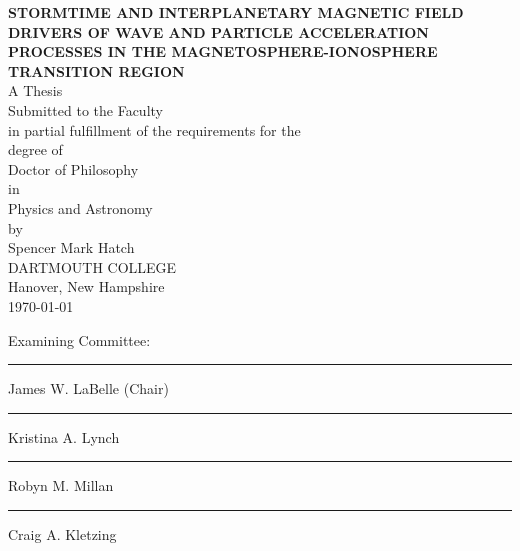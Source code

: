 \begin{titlepage}
 \begin{center}
   \MakeUppercase{\bf Stormtime and interplanetary magnetic field
     drivers of wave and particle acceleration processes in the
     magnetosphere-ionosphere transition region}
   \\ %
   A Thesis                 \\
   Submitted to the Faculty \\
   in partial fulfillment of the requirements for the \\
   degree of              \\
   Doctor of Philosophy
   \\ %
   in                     \\
   Physics and Astronomy \\ %
   by                     \\
   Spencer Mark Hatch \\ %
   DARTMOUTH COLLEGE      \\
   Hanover, New Hampshire \\
   \today
 \end{center}
 \vspace{\baselineskip}
 
 \vspace*{\fill}
 
 \begin{minipage}[b]{\linewidth}
 
    \begin{flushright}
        
        \begin{minipage}[b]{0.45\linewidth}
            \begin{center}
                Examining Committee:
            \end{center}
            \vspace{0.5in}
            \hrule \vspace{0.1in}
            James W. LaBelle (Chair) \\ \vspace{0.3in} %
            \hrule \vspace{0.1in}
            Kristina A. Lynch \\ \vspace{0.3in}           %
            \hrule \vspace{0.1in}
            Robyn M. Millan \\ \vspace{0.3in}       %
            \hrule \vspace{0.1in} 
            Craig A. Kletzing                        %
        \end{minipage}
    \end{flushright}
 

\end{minipage}
\end{titlepage}
